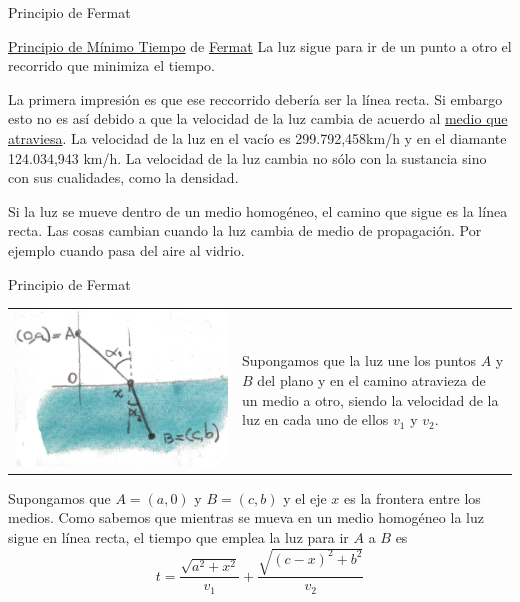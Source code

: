 \documentclass[handout,hyperref={colorlinks=true}]{beamer}
\newcommand{\nl}{\onslide<+-> }
\begin{document}
\begin{frame}{Principio de Fermat}

\nl\begin{block}{\href{http://es.wikipedia.org/wiki/Principio_de_Fermat}{Principio de Mínimo Tiempo} de \href{http://es.wikipedia.org/wiki/Fermat}{Fermat}}
 La luz sigue para ir de un punto a otro el recorrido que minimiza el tiempo.
\end{block}

\nl La primera impresión   es que ese reccorrido debería ser la línea recta. Si embargo esto no es así debido a que la velocidad de la luz cambia
de acuerdo al \href{http://es.wikipedia.org/wiki/Velocidad_de_la_luz_en_un_medio_material}{medio que atraviesa}. 
La velocidad de la luz en el vacío es 299.792,458km/h y en el diamante 124.034,943 km/h. La velocidad de la luz cambia no sólo con la sustancia sino con sus cualidades, 
como la densidad. 

\nl Si la luz se mueve dentro de un medio homogéneo, el camino que sigue es la línea recta. Las cosas cambian cuando la luz cambia de medio de propagación. Por ejemplo
cuando pasa del aire al vidrio. 

\end{frame}

\begin{frame}{Principio de Fermat}
\begin{tabular}{m{4cm} m{5.5cm}}
 \includegraphics[scale=.07]{imagenes/refraccion.jpg} & Supongamos que la luz une los puntos $A$ y $B$ del plano y en el camino atravieza de un medio a otro, siendo la velocidad
 de la luz en cada uno de ellos $v_1$ y $v_2$. 
 \end{tabular}
Supongamos que $A=(a,0)$ y $B=(c,b)$ y el eje $x$ es la frontera entre los medios. Como sabemos que mientras se mueva en un medio homogéneo la luz sigue en línea recta, 
el tiempo que emplea la luz para ir $A$ a $B$ es
 \[t=\frac{\sqrt{a^{2} + x^{2}}}{v_{1}} + \frac{\sqrt{{\left(c - x\right)}^{2} + b^{2}}}{v_{2}}\]
 
\end{frame}
\end{document}
